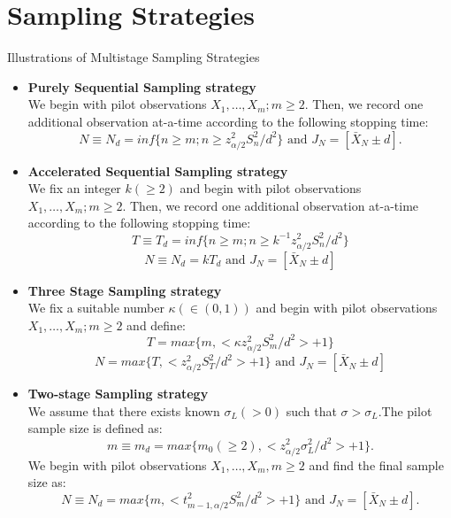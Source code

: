 \documentclass [xcolor=svgnames, t] {beamer}
\begin{document}
\section{Sampling Strategies}
\begin{frame}{Illustrations of Multistage Sampling Strategies}
    \begin{itemize}
    \item \textbf{Purely Sequential Sampling strategy}
\\ We begin with pilot observations $X_1,\dots ,X_m; m\ge 2$. Then, we record one additional observation 
at-a-time according to the following stopping time:
\begin{equation*}
    N \equiv N_d=inf\{ n \ge m; n \ge z^2_{\alpha/2}S_n^2/d^2 \}  \textrm{ and }  J_N=[\bar{X}_N \pm d].
\end{equation*}

\item \textbf{Accelerated Sequential Sampling strategy}\\
We fix an integer $k(\geq 2)$ and begin with pilot observations $X_1,\dots ,X_m; m\ge 2$. Then, we record 
one additional observation at-a-time according to the following stopping time:        
        $$ T \equiv T_d=inf\{ n \ge m; n \ge k^{-1}z^2_{\alpha/2}S_n^2/d^2 \} $$ 
        $$ N \equiv N_d = kT_d  \text{ and } J_N=[\bar{X}_N \pm d] $$
    \end{itemize}
\end{frame}
\begin{frame}
    \begin{itemize}
 
\item \textbf{Three Stage Sampling strategy}\\
We fix a suitable number $\kappa(\in (0,1))$ and begin with pilot observations $X_1,\dots ,X_m; m\ge 2$ and define:
        $$ T =max\{  m,  <\kappa z^2_{\alpha/2}S_m^2/d^2 >+1\} $$ 
        $$ N =max \{ T,  <z^2_{\alpha/2}S_T^2/d^2 >+1\}  \text{ and } J_N=[\bar{X}_N \pm d] $$
 

\item \textbf{Two-stage Sampling strategy}
    \\ We assume that there exists known $\sigma_L(>0)$ such that $\sigma>\sigma_L$.The pilot sample size is defined as:
    $$m\equiv m_d=max \{ m_0(\ge 2),<z^2_{\alpha/2}\sigma_L^2/d^2>+1\}.$$
    We begin with pilot observations $X_1,\dots ,X_m, m \ge 2$ and find the final sample size as:
    \begin{equation*}
    N \equiv N_d=max\{ m,< t^2_{m-1,\alpha/2}S_m^2/d^2>+1\} \text{ and } J_N=[\bar{X}_N \pm d].
\end{equation*}

    \end{itemize}
\end{frame}
\end{document}
